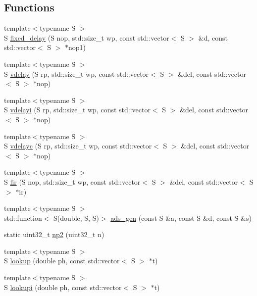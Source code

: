 \subsection*{Functions}
\begin{DoxyCompactItemize}
\item 
{\footnotesize template$<$typename S $>$ }\\S \hyperlink{namespace_aurora_ad2d492fbf6dc9b468619e2403ace6e25}{fixed\+\_\+delay} (S nop, std\+::size\+\_\+t wp, const std\+::vector$<$ S $>$ \&d, const std\+::vector$<$ S $>$ $\ast$nop1)
\item 
{\footnotesize template$<$typename S $>$ }\\S \hyperlink{namespace_aurora_addae9c1b83fcfd6ee11bbbe5a4d3d329}{vdelay} (S rp, std\+::size\+\_\+t wp, const std\+::vector$<$ S $>$ \&del, const std\+::vector$<$ S $>$ $\ast$nop)
\item 
{\footnotesize template$<$typename S $>$ }\\S \hyperlink{namespace_aurora_aa162bda687dbe871e0517cfae199378c}{vdelayi} (S rp, std\+::size\+\_\+t wp, const std\+::vector$<$ S $>$ \&del, const std\+::vector$<$ S $>$ $\ast$nop)
\item 
{\footnotesize template$<$typename S $>$ }\\S \hyperlink{namespace_aurora_a123381990bd6cdcd199852e31a8987c6}{vdelayc} (S rp, std\+::size\+\_\+t wp, const std\+::vector$<$ S $>$ \&del, const std\+::vector$<$ S $>$ $\ast$nop)
\item 
{\footnotesize template$<$typename S $>$ }\\S \hyperlink{namespace_aurora_aa192a550af8daa02ad2ee172339ba0d9}{fir} (S nop, std\+::size\+\_\+t wp, const std\+::vector$<$ S $>$ \&del, const std\+::vector$<$ S $>$ $\ast$ir)
\item 
{\footnotesize template$<$typename S $>$ }\\std\+::function$<$ S(double, S, S)$>$ \hyperlink{namespace_aurora_a966a076f1768216bd9c2d6a07aebf034}{ads\+\_\+gen} (const S \&a, const S \&d, const S \&s)
\item 
static uint32\+\_\+t \hyperlink{namespace_aurora_a49b6f6d92479d80271ced42627154066}{np2} (uint32\+\_\+t n)
\item 
{\footnotesize template$<$typename S $>$ }\\S \hyperlink{namespace_aurora_ae0082f7bc3946a88145d54bacd0c6ff3}{lookup} (double ph, const std\+::vector$<$ S $>$ $\ast$t)
\item 
{\footnotesize template$<$typename S $>$ }\\S \hyperlink{namespace_aurora_a9246ac499667da52a0d1750e5238c4a8}{lookupi} (double ph, const std\+::vector$<$ S $>$ $\ast$t)

\end{DoxyCompactItemize}
